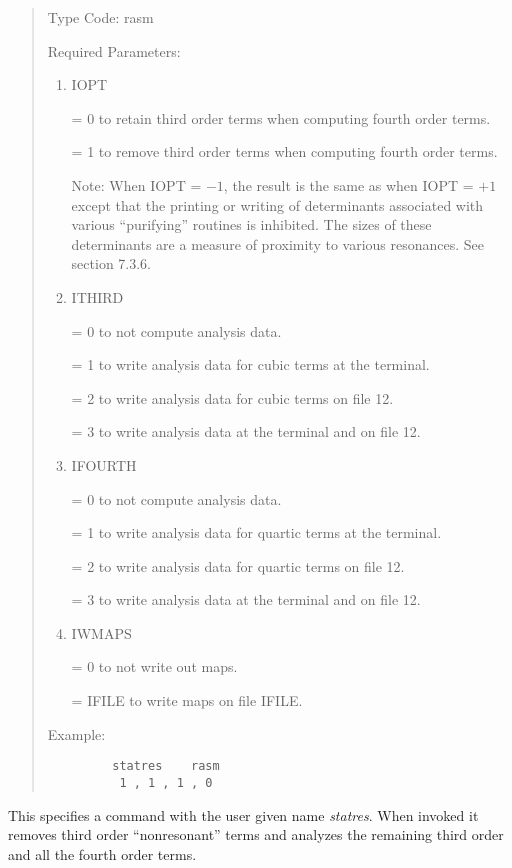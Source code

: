 \begin{quotation}
\noindent Type Code:  rasm
\vspace{5mm}

\noindent Required Parameters:
\begin{enumerate}
      \item  IOPT

             = 0 to retain third order terms when computing fourth order terms.

             = 1 to remove third order terms when computing fourth order terms.

             Note:  When IOPT = $-1$, the result is the same as when IOPT =
             $+1$ except that the printing or writing of determinants
             associated with various ``purifying'' routines is inhibited.
             The sizes of these determinants are a measure of proximity to
             various resonances.  See section 7.3.6.

      \item  ITHIRD

             = 0 to not compute analysis data.

             = 1 to write analysis data for cubic terms at the terminal.

             = 2 to write analysis data for cubic terms on file 12.

             = 3 to write analysis data at the terminal and on file 12.

      \item  IFOURTH

             = 0 to not compute analysis data.

             = 1 to write analysis data for quartic terms at the terminal.

             = 2 to write analysis data for quartic terms on file 12.

             = 3 to write analysis data at the terminal and on file 12.

      \item  IWMAPS

             = 0 to not write out maps.

             = IFILE to write maps on file IFILE.
\end{enumerate}

\vspace{5mm}
\noindent Example:
\begin{verbatim}
         statres    rasm
          1 , 1 , 1 , 0
\end{verbatim}
\end{quotation}
This specifies a command with the user given name {\em statres}.  When invoked it removes third order ``nonresonant'' terms and analyzes the remaining third order and all the fourth order terms.

